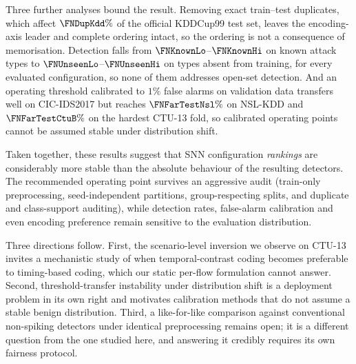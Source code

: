 Three further analyses bound the result. Removing exact train--test duplicates,
which affect $\FNDupKdd\%$ of the official KDDCup99 test set, leaves the
encoding-axis leader and complete ordering intact, so the ordering is not a
consequence of memorisation. Detection falls from $\FNKnownLo$--$\FNKnownHi$ on
known attack types to $\FNUnseenLo$--$\FNUnseenHi$ on types absent from
training, for every evaluated configuration, so none of them addresses open-set
detection. And an operating threshold calibrated to $1\%$ false alarms on
validation data transfers well on CIC-IDS2017 but reaches $\FNFarTestNsl\%$ on
NSL-KDD and $\FNFarTestCtuB\%$ on the hardest CTU-13 fold, so calibrated
operating points cannot be assumed stable under distribution shift.

Taken together, these results suggest that SNN configuration \emph{rankings} are
considerably more stable than the absolute behaviour of the resulting detectors.
The recommended operating point survives an aggressive audit (train-only
preprocessing, seed-independent partitions, group-respecting splits, and
duplicate and class-support auditing), while detection rates, false-alarm
calibration and even encoding preference remain sensitive to the evaluation
distribution.

Three directions follow. First, the scenario-level inversion we observe on
CTU-13 invites a mechanistic study of when temporal-contrast coding becomes
preferable to timing-based coding, which our static per-flow formulation cannot
answer. Second, threshold-transfer instability under distribution shift is a
deployment problem in its own right and motivates calibration methods that do
not assume a stable benign distribution. Third, a like-for-like comparison
against conventional non-spiking detectors under identical preprocessing remains
open; it is a different question from the one studied here, and answering it
credibly requires its own fairness protocol.
